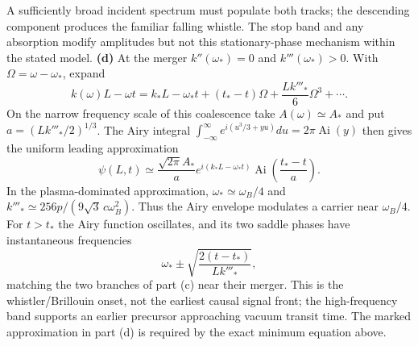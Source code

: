 A sufficiently broad incident spectrum must populate both tracks;
the descending component produces the familiar falling whistle.
The stop band and any absorption modify amplitudes but not this
stationary-phase mechanism within the stated model.
\textbf{(d)} At the merger $k''(\omega_*)=0$ and
$k'''(\omega_*)>0$. With $\Omega=\omega-\omega_*$, expand
\[
k(\omega)L-\omega t
=k_*L-\omega_*t+(t_*-t)\Omega
+\frac{Lk'''_*}{6}\Omega^3+\cdots.
\]
On the narrow frequency scale of this coalescence take
$A(\omega)\simeq A_*$ and put $a=(Lk'''_*/2)^{1/3}$.
The Airy integral
$\int_{-\infty}^{\infty}e^{i(u^3/3+yu)}du=2\pi\operatorname{Ai}(y)$
then gives the uniform leading approximation
\[
\boxed{\psi(L,t)\simeq\frac{\sqrt{2\pi} A_*}{a}
 e^{i(k_*L-\omega_*t)}
\operatorname{Ai}\!\left(\frac{t_*-t}{a}\right).}
\]
In the plasma-dominated approximation,
$\omega_*\simeq\omega_B/4$ and
$k'''_*\simeq256p/(9\sqrt3\,c\omega_B^2)$.
Thus the Airy envelope modulates a carrier near $\omega_B/4$.
For $t>t_*$ the Airy function oscillates, and its two saddle phases
have instantaneous frequencies
\[
\omega_*\pm\sqrt{\frac{2(t-t_*)}{Lk'''_*}},
\]
matching the two branches of part (c) near their merger. This is
the whistler/Brillouin onset, not the earliest causal signal front;
the high-frequency band supports an earlier precursor approaching
vacuum transit time. The marked approximation in part (d) is
required by the exact minimum equation above.


